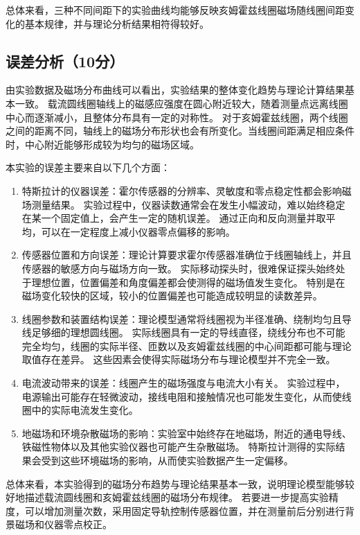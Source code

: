 \documentclass[10pt,a4paper]{ctexart} %
\begin{document}
  总体来看，三种不同间距下的实验曲线均能够反映亥姆霍兹线圈磁场随线圈间距变化的基本规律，并与理论分析结果相符得较好。

  \subsection{误差分析（10分）}
  由实验数据及磁场分布曲线可以看出，实验结果的整体变化趋势与理论计算结果基本一致。
  载流圆线圈轴线上的磁感应强度在圆心附近较大，随着测量点远离线圈中心而逐渐减小，且整体分布具有一定的对称性。
  对于亥姆霍兹线圈，两个线圈之间的距离不同，轴线上的磁场分布形状也会有所变化。当线圈间距满足相应条件时，中心附近能够形成较为均匀的磁场区域。

  本实验的误差主要来自以下几个方面：
  \begin{enumerate}
    \item 特斯拉计的仪器误差：霍尔传感器的分辨率、灵敏度和零点稳定性都会影响磁场测量结果。
    实验过程中，仪器读数通常会在发生小幅波动，难以始终稳定在某一个固定值上，会产生一定的随机误差。
    通过正向和反向测量并取平均，可以在一定程度上减小仪器零点偏移的影响。

    \item 传感器位置和方向误差：理论计算要求霍尔传感器准确位于线圈轴线上，并且传感器的敏感方向与磁场方向一致。
    实际移动探头时，很难保证探头始终处于理想位置，位置偏差和角度偏差都会使测得的磁场值发生变化。
    特别是在磁场变化较快的区域，较小的位置偏差也可能造成较明显的读数差异。

    \item 线圈参数和装置结构误差：理论模型通常将线圈视为半径准确、绕制均匀且导线足够细的理想圆线圈。
    实际线圈具有一定的导线直径，绕线分布也不可能完全均匀，线圈的实际半径、匝数以及亥姆霍兹线圈的中心间距都可能与理论取值存在差异。
    这些因素会使得实际磁场分布与理论模型并不完全一致。

    \item 电流波动带来的误差：线圈产生的磁场强度与电流大小有关。
    实验过程中，电源输出可能存在轻微波动，接线电阻和接触情况也可能发生变化，从而使线圈中的实际电流发生变化。

    \item 地磁场和环境杂散磁场的影响：实验室中始终存在地磁场，附近的通电导线、铁磁性物体以及其他实验仪器也可能产生杂散磁场。
    特斯拉计测得的实际结果会受到这些环境磁场的影响，从而使实验数据产生一定偏移。
  \end{enumerate}

  总体来看，本实验得到的磁场分布趋势与理论结果基本一致，说明理论模型能够较好地描述载流圆线圈和亥姆霍兹线圈的磁场分布规律。
  若要进一步提高实验精度，可以增加测量次数，采用固定导轨控制传感器位置，并在测量前后分别进行背景磁场和仪器零点校正。
\end{document}
